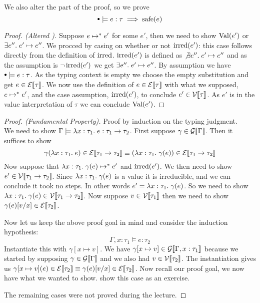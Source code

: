 We also alter the  part of the proof, so we prove
\[
  \mtenv \models e : \tau \implies \safe(e)
\]
\begin{proof}[Proof. (Altered )]
Suppose $e \mapsto^{*} e'$ for some $e'$, then we need to show $\operatorname{Val}(e')$ or $\exists e''. \; e' \mapsto e''$. We procced by casing on whether or not $\operatorname{irred}(e')$:
 this case follows directly from the definition of $\operatorname{irred}$. $\operatorname{irred}(e')$ is defined as $\not \exists e''. \; e' \mapsto e''$ and as the assumption is $\neg \operatorname{irred}(e')$ we get $\exists e''. \; e' \mapsto e''$.
 By assumption we have $\mtenv \models e : \tau$. As the typing context is empty we choose the empty substitution and get $e \in \mathcal{E}\llbracket \tau \rrbracket$. We now use the definition of $e \in \mathcal{E}\llbracket \tau \rrbracket$ with what we supposed, $e \mapsto^{*} e'$, and the case assumption, $\operatorname{irred}(e')$, to conclude $e' \in \mathcal{V}\llbracket \tau \rrbracket$. As $e'$ is in the value interpretation of $\tau$ we can conclude $\operatorname{Val}(e')$. 
\end{proof}
\begin{proof}[Proof. (Fundamental Property)] Proof by induction on the typing judgment.
  \case{\TAbs} \\
We need to show $\Gamma \models \lambda x : \tau_1 . \; e :  \tau_1 \rightarrow \tau_2$. First suppose $\gamma \in \mathcal{G}\llbracket \Gamma \rrbracket$. Then it suffices to show
\[
  \gamma(\lambda x : \tau_1 . \; e) \in \mathcal{E}\llbracket  \tau_1 \rightarrow \tau_2 \rrbracket \equiv
  (\lambda x : \tau_1 . \; \gamma(e)) \in \mathcal{E}\llbracket  \tau_1 \rightarrow \tau_2 \rrbracket
\]
Now suppose that $\lambda x : \tau_1 . \; \gamma(e) \mapsto^{*} e'$ and $\operatorname{irred}(e')$. We then need to show $e' \in \mathcal{V}\llbracket  \tau_1 \rightarrow \tau_2 \rrbracket$. Since $\lambda x : \tau_1 . \; \gamma(e)$ is a value it is irreducible, and we can conclude it took no steps. In other words $e' = \lambda x : \tau_1 . \; \gamma(e)$. So we need to show $\lambda x : \tau_1 . \; \gamma(e) \in \mathcal{V}\llbracket  \tau_1 \rightarrow \tau_2 \rrbracket$. Now suppose $v \in \mathcal{V}\llbracket \tau_1 \rrbracket$ then we need to show $\gamma(e)[v/x] \in \mathcal{E}\llbracket \tau_2 \rrbracket$.

Now let us keep the above proof goal in mind and consider the induction hypothesis:
\[
  \Gamma, x: \tau_1 \models e : \tau_2
\]
Instantiate this with $\gamma[x \mapsto v]$. We have $\gamma[x \mapsto v] \in \mathcal{G}\llbracket \Gamma, x : \tau_1 \rrbracket$ because we started by supposing $\gamma \in \mathcal{G}\llbracket \Gamma \rrbracket$ and we also had $v \in \mathcal{V}\llbracket \tau_2 \rrbracket$. The instantiation gives us $\gamma[x \mapsto v] (e) \in  \mathcal{E}\llbracket \tau_2 \rrbracket \equiv \gamma(e)[v/x] \in \mathcal{E}\llbracket \tau_2 \rrbracket$. Now recall our proof goal, we now have what we wanted to show.
\case{\TApp} show this case as an exercise.

The remaining cases were not proved during the lecture.
\end{proof}

